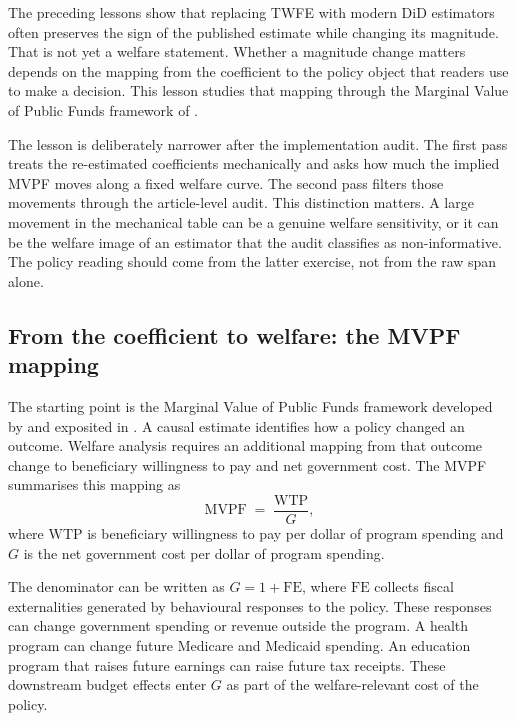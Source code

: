 The preceding lessons show that replacing TWFE with modern DiD estimators often preserves the sign of the published estimate while changing its magnitude. That is not yet a welfare statement. Whether a magnitude change matters depends on the mapping from the coefficient to the policy object that readers use to make a decision. This lesson studies that mapping through the Marginal Value of Public Funds framework of \textcite{hendren2020unified}.

The lesson is deliberately narrower after the implementation audit. The first pass treats the re-estimated coefficients mechanically and asks how much the implied MVPF moves along a fixed welfare curve. The second pass filters those movements through the article-level audit. This distinction matters. A large movement in the mechanical table can be a genuine welfare sensitivity, or it can be the welfare image of an estimator that the audit classifies as non-informative. The policy reading should come from the latter exercise, not from the raw span alone.

\subsection{From the coefficient to welfare: the MVPF mapping}

The starting point is the Marginal Value of Public Funds framework developed by \textcite{hendren2020unified} and exposited in \textcite{finkelstein2020welfare}. A causal estimate identifies how a policy changed an outcome. Welfare analysis requires an additional mapping from that outcome change to beneficiary willingness to pay and net government cost. The MVPF summarises this mapping as
\begin{equation*}
\mathrm{MVPF} \;=\; \frac{\mathrm{WTP}}{G},
\end{equation*}
where \(\mathrm{WTP}\) is beneficiary willingness to pay per dollar of program spending and \(G\) is the net government cost per dollar of program spending.

The denominator can be written as \(G = 1 + \mathrm{FE}\), where \(\mathrm{FE}\) collects fiscal externalities generated by behavioural responses to the policy. These responses can change government spending or revenue outside the program. A health program can change future Medicare and Medicaid spending. An education program that raises future earnings can raise future tax receipts. These downstream budget effects enter \(G\) as part of the welfare-relevant cost of the policy.

